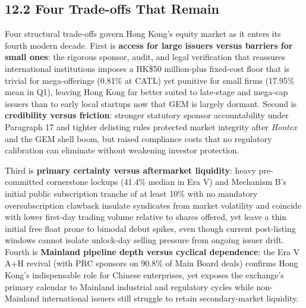 \documentclass[11pt,letterpaper]{article}
\begin{document}
\subsection*{\texorpdfstring{12.2 Four Trade-offs That Remain}{12.2 Four Trade-offs That Remain}}
Four structural trade-offs govern Hong Kong's equity market as it enters its fourth modern decade. First is \textbf{access for large issuers versus barriers for small ones}: the rigorous sponsor, audit, and legal verification that reassures international institutions imposes a HK\$50 million-plus fixed-cost floor that is trivial for mega-offerings (0.81\% at CATL) yet punitive for small firms (17.95\% mean in Q1), leaving Hong Kong far better suited to late-stage and mega-cap issuers than to early local startups now that GEM is largely dormant. Second is \textbf{credibility versus friction}: stronger statutory sponsor accountability under Paragraph 17 and tighter delisting rules protected market integrity after \textit{Hontex} and the GEM shell boom, but raised compliance costs that no regulatory calibration can eliminate without weakening investor protection.

Third is \textbf{primary certainty versus aftermarket liquidity}: heavy pre-committed cornerstone lockups (41.4\% median in Era V) and Mechanism B's initial public subscription tranche of at least 10\% with no mandatory oversubscription clawback insulate syndicates from market volatility and coincide with lower first-day trading volume relative to shares offered, yet leave a thin initial free float prone to bimodal debut spikes, even though current post-listing windows cannot isolate unlock-day selling pressure from ongoing issuer drift. Fourth is \textbf{Mainland pipeline depth versus cyclical dependence}: the Era V A+H revival (with PRC sponsors on 90.8\% of Main Board deals) confirms Hong Kong's indispensable role for Chinese enterprises, yet exposes the exchange's primary calendar to Mainland industrial and regulatory cycles while non-Mainland international issuers still struggle to retain secondary-market liquidity.
\end{document}
